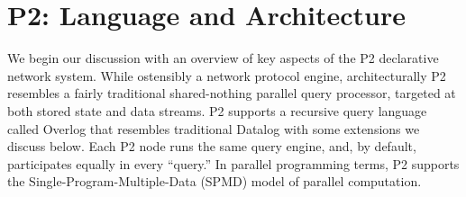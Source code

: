 \documentclass{sigmod08}
\begin{document}
\section{P2: Language and Architecture}
\label{sec:arch}
We begin our discussion with an overview of key aspects of the P2 declarative network system.
While ostensibly a network protocol engine, architecturally P2 resembles a fairly traditional shared-nothing parallel query processor, targeted at both stored state and data streams.  P2 supports a recursive query language called Overlog that resembles traditional Datalog with some extensions we discuss below.  Each P2 node runs the same query engine, and, by default, participates equally in every ``query.''   In parallel programming terms, P2 
supports the  Single-Program-Multiple-Data (SPMD) model of parallel computation.
\end{document}
